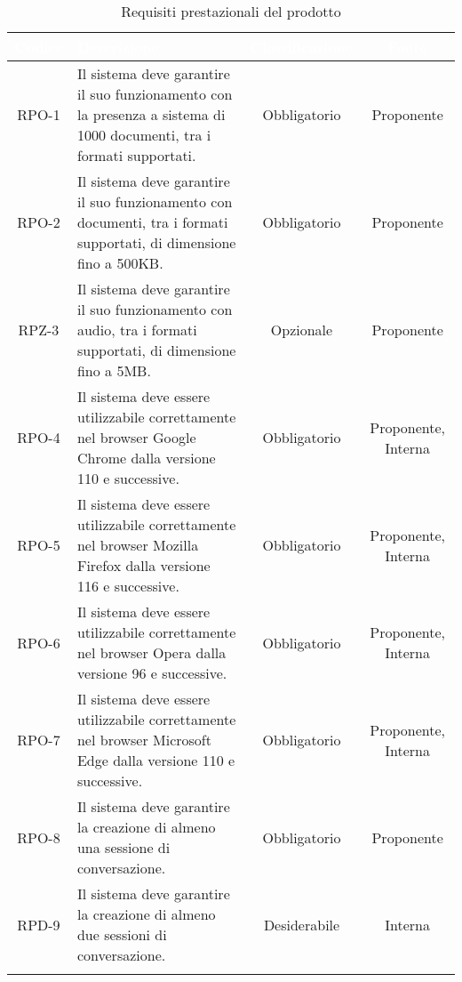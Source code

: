 \begingroup
\setlength{\tabcolsep}{10pt}
\renewcommand{\arraystretch}{1.5}
\begin{xltabular}{\textwidth}{| c | X | c | c |}
    \hline
     \textbf{\textcolor{white}{Codice}} & \textbf{\textcolor{white}{Descrizione}} & \textbf{\textcolor{white}{Classificazione}} & \textbf{\textcolor{white}{Fonte}}\\
    \hline
    \endhead
    RPO-1 & Il sistema deve garantire il suo funzionamento con la presenza a sistema di 1000 documenti, tra i formati supportati.  & Obbligatorio & Proponente\\
    \hline
    RPO-2 & Il sistema deve garantire il suo funzionamento con documenti, tra i formati supportati, di dimensione fino a 500KB. & Obbligatorio & Proponente\\
    \hline
    RPZ-3 & Il sistema deve garantire il suo funzionamento con audio, tra i formati supportati, di dimensione fino a 5MB. & Opzionale & Proponente\\
    \hline
    RPO-4 & Il sistema deve essere utilizzabile correttamente nel browser Google Chrome dalla versione 110 e successive. & Obbligatorio & Proponente, Interna\\
    \hline
    RPO-5 & Il sistema deve essere utilizzabile correttamente nel browser Mozilla Firefox dalla versione 116 e successive. & Obbligatorio & Proponente, Interna\\
    \hline
    RPO-6 & Il sistema deve essere utilizzabile correttamente nel browser Opera dalla versione 96 e successive. & Obbligatorio & Proponente, Interna\\
    \hline
    RPO-7 & Il sistema deve essere utilizzabile correttamente nel browser Microsoft Edge dalla versione 110 e successive. & Obbligatorio & Proponente, Interna\\
    \hline
    RPO-8 & Il sistema deve garantire la creazione di almeno una sessione di conversazione. & Obbligatorio & Proponente\\
    \hline
    RPD-9 & Il sistema deve garantire la creazione di almeno due sessioni di conversazione. & Desiderabile & Interna\\
    \hline
     \caption{Requisiti prestazionali del prodotto}
    \label{tab:reqpre}
\end{xltabular}
\endgroup

